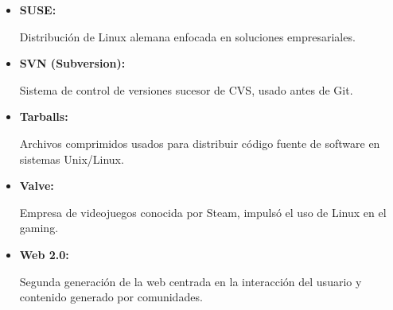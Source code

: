 \documentclass[a4paper,12pt]{article}
\begin{document}
\begin{itemize}
\item \hypertarget{suse}{\textbf{SUSE:}} Distribución de Linux alemana enfocada
en soluciones empresariales.  \label{suse}

\item \hypertarget{svn}{\textbf{SVN (Subversion):}} Sistema de control de
versiones sucesor de CVS, usado antes de Git.  \label{svn}

\item \hypertarget{tarballs}{\textbf{Tarballs:}} Archivos comprimidos usados
para distribuir código fuente de software en sistemas Unix/Linux.
\label{tarballs}

\item \hypertarget{valve}{\textbf{Valve:}} Empresa de videojuegos conocida por
Steam, impulsó el uso de Linux en el gaming.  \label{valve}

\item \hypertarget{web2}{\textbf{Web 2.0:}} Segunda generación de la web
centrada en la interacción del usuario y contenido generado por comunidades.
\label{web2} 

\end{itemize}
\end{document}
